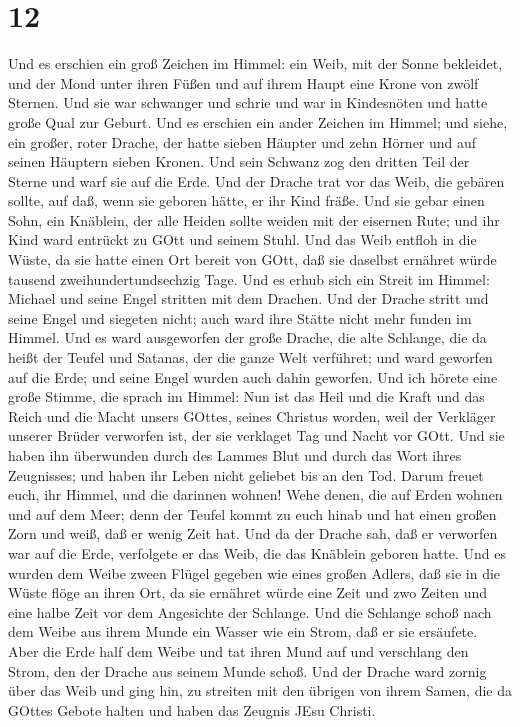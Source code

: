 \hypertarget{section-10}{%
\section{12}\label{section-10}}

 Und es erschien ein groß Zeichen im Himmel: ein Weib, mit
der Sonne bekleidet, und der Mond unter ihren Füßen und auf ihrem Haupt
eine Krone von zwölf Sternen.  Und sie war schwanger und
schrie und war in Kindesnöten und hatte große Qual zur Geburt.
 Und es erschien ein ander Zeichen im Himmel; und siehe, ein
großer, roter Drache, der hatte sieben Häupter und zehn Hörner und auf
seinen Häuptern sieben Kronen.  Und sein Schwanz zog den
dritten Teil der Sterne und warf sie auf die Erde. Und der Drache trat
vor das Weib, die gebären sollte, auf daß, wenn sie geboren hätte, er
ihr Kind fräße.  Und sie gebar einen Sohn, ein Knäblein, der
alle Heiden sollte weiden mit der eisernen Rute; und ihr Kind ward
entrückt zu GOtt und seinem Stuhl.  Und das Weib entfloh in
die Wüste, da sie hatte einen Ort bereit von GOtt, daß sie daselbst
ernähret würde tausend zweihundertundsechzig Tage.  Und es
erhub sich ein Streit im Himmel: Michael und seine Engel stritten mit
dem Drachen. Und der Drache stritt und seine Engel  und
siegeten nicht; auch ward ihre Stätte nicht mehr funden im Himmel.
 Und es ward ausgeworfen der große Drache, die alte
Schlange, die da heißt der Teufel und Satanas, der die ganze Welt
verführet; und ward geworfen auf die Erde; und seine Engel wurden auch
dahin geworfen.  Und ich hörete eine große Stimme, die
sprach im Himmel: Nun ist das Heil und die Kraft und das Reich und die
Macht unsers GOttes, seines Christus worden, weil der Verkläger unserer
Brüder verworfen ist, der sie verklaget Tag und Nacht vor GOtt.
 Und sie haben ihn überwunden durch des Lammes Blut und
durch das Wort ihres Zeugnisses; und haben ihr Leben nicht geliebet bis
an den Tod.  Darum freuet euch, ihr Himmel, und die
darinnen wohnen! Wehe denen, die auf Erden wohnen und auf dem Meer; denn
der Teufel kommt zu euch hinab und hat einen großen Zorn und weiß, daß
er wenig Zeit hat.  Und da der Drache sah, daß er verworfen
war auf die Erde, verfolgete er das Weib, die das Knäblein geboren
hatte.  Und es wurden dem Weibe zween Flügel gegeben wie
eines großen Adlers, daß sie in die Wüste flöge an ihren Ort, da sie
ernähret würde eine Zeit und zwo Zeiten und eine halbe Zeit vor dem
Angesichte der Schlange.  Und die Schlange schoß nach dem
Weibe aus ihrem Munde ein Wasser wie ein Strom, daß er sie ersäufete.
 Aber die Erde half dem Weibe und tat ihren Mund auf und
verschlang den Strom, den der Drache aus seinem Munde schoß.
 Und der Drache ward zornig über das Weib und ging hin, zu
streiten mit den übrigen von ihrem Samen, die da GOttes Gebote halten
und haben das Zeugnis JEsu Christi.

